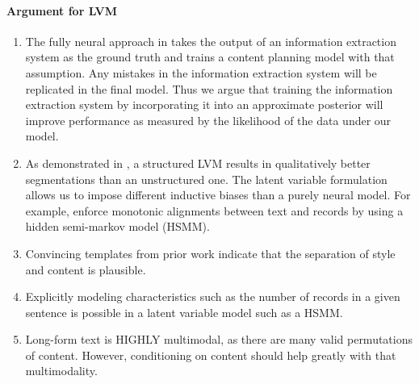 \documentclass[11pt]{article}
\begin{document}
\paragraph{Argument for LVM}
\begin{enumerate}
\item The fully neural approach in \citep{puduppully2018contentselection} takes the output of
an information extraction system as the ground truth and trains a content planning model with
that assumption.
Any mistakes in the information extraction system will be replicated in the final model.
Thus we argue that training the information extraction system by incorporating it
into an approximate posterior will improve performance as measured by
the likelihood of the data under our model.
\item As demonstrated in \citep{liang2009semalign},
a structured LVM results in qualitatively better segmentations than an unstructured one.
The latent variable formulation allows us to impose different inductive biases than a 
purely neural model.
For example, \citep{liang2009semalign} enforce monotonic alignments between text and records by using a 
hidden semi-markov model (HSMM).
\item Convincing templates from prior work \citep{wiseman2018template} indicate that the separation of
style and content is plausible.
\item Explicitly modeling characteristics such as the number of records in a given
sentence is possible in a latent variable model such as a HSMM.
\item Long-form text is HIGHLY multimodal, as there are many valid permutations of content. 
However, conditioning on content should help greatly with that multimodality.
\end{enumerate}
\end{document}
